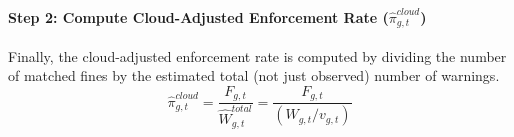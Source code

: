 \documentclass[12pt]{article}
\begin{document}
\begin{appendices}
\paragraph{Step 2: Compute Cloud-Adjusted Enforcement Rate ($\hat{\pi}_{g,t}^{cloud}$)}
Finally, the cloud-adjusted enforcement rate is computed by dividing the number of matched fines by the estimated total (not just observed) number of warnings.
\begin{equation}
\hat{\pi}_{g,t}^{cloud} = \frac{F_{g,t}}{\hat{W}^{total}_{g,t}} = \frac{F_{g,t}}{(W_{g,t} / v_{g,t})}
\end{equation}

\end{appendices}
\end{document}
